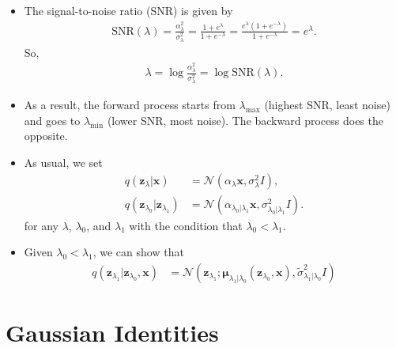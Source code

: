 \documentclass[10pt]{article}
\newcommand{\ve}[1]{\mathbf{#1}}
\newcommand{\ves}[1]{\boldsymbol{#1}}
\newcommand{\N}{\mathcal{N}}
\newcommand{\SNR}{\mathrm{SNR}}
\begin{document}
\begin{itemize}
\begin{itemize}
    \item The signal-to-noise ratio (SNR) is given by
    \begin{align*}
      \SNR(\lambda) = \frac{\alpha^2_\lambda}{\sigma^2_\lambda} = \frac{1 + e^{\lambda}}{1 + e^{-\lambda}} = \frac{e^{\lambda}(1 + e^{-\lambda})}{1 + e^{-\lambda}} = e^{\lambda}.
    \end{align*}
    So,
    \begin{align*}
      \lambda = \log \frac{\alpha_\lambda^2}{\sigma^2_\lambda} = \log \SNR(\lambda).
    \end{align*}

    \item As a result, the forward process starts from $\lambda_{\max}$ (highest SNR, least noise) and goes to $\lambda_{\min}$ (lower SNR, most noise). The backward process does the opposite.
    
    \item As usual, we set
    \begin{align*}
      q(\ve{z}_\lambda | \ve{x}) &= \N(\alpha_\lambda \ve{x}, \sigma_\lambda^2 I), \\
      q(\ve{z}_{\lambda_0}|\ve{z}_{\lambda_1}) &= \N(\alpha_{\lambda_0|\lambda_1} \ve{x}, \sigma^2_{\lambda_0|\lambda_1} I).
    \end{align*}
    for any $\lambda$, $\lambda_0$, and $\lambda_1$ with the condition that $\lambda_0 < \lambda_1$.
  
    \item Given $\lambda_0 < \lambda_1$, we can show that
    \begin{align*}
      q(\ve{z}_{\lambda_1} | \ve{z}_{\lambda_0}, \ve{x})
      &= \N(\ve{z}_{\lambda_1}; \ves{\mu}_{\lambda_1|\lambda_0}(\ve{z}_{\lambda_0}, \ve{x}), \tilde{\sigma}^2_{\lambda_1|\lambda_0}I)
    \end{align*}
  \end{itemize}

  
\end{itemize}

\appendix

\section{Gaussian Identities}
\end{document}
